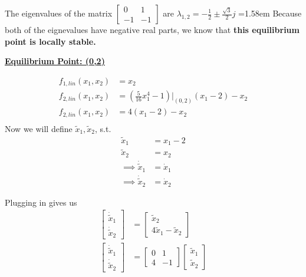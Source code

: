 \documentclass{article}
\begin{document}
  The eigenvalues of the matrix $\begin{bmatrix}
      0 & 1 \\
      -1&  -1
  \end{bmatrix}$ are $\lambda_{1,2} = -\frac{1}{2} \pm \frac{\sqrt{3}}{2}j$
  \newline
  \hangindent=1.58em
   Because both of the eignevalues have negative real parts, we know that \textbf{this
  equilibrium point is locally stable.} \newline
  
  \textbf{\underline{Equilibrium Point: (0,\hspace{0.8mm}2)}}

  \begin{align*}
    f_{1, lin}(x_1,x_2) &= x_2 \\
    f_{2, lin}(x_1,x_2) &= (\frac{5}{16}x_1^4 -1)\bigg|_{(0,2)}(x_1-2) - x_2 \\
    f_{2, lin}(x_1,x_2) &= 4(x_1-2) -x_2 \\
  \end{align*}
  \indent Now we will define $\tilde{x}_1, \tilde{x}_2$, s.t.
  \begin{align*}
    \tilde{x}_1 &= x_1-2 \\
    \tilde{x}_2 &= x_2 \\
    \implies \dot{\tilde{x}}_1 &= \dot{x}_1 \\
    \implies \dot{\tilde{x}}_2 &= \dot{x}_2
  \end{align*}
  
  \indent Plugging in gives us
  \begin{align*}
    \begin{bmatrix}
      \dot{\tilde{x}}_1 \\
      \dot{\tilde{x}}_2
    \end{bmatrix} &=
    \begin{bmatrix}
      \tilde{x}_2 \\
      4\tilde{x}_1 - \tilde{x}_2
    \end{bmatrix} \\
    \begin{bmatrix}
      \dot{\tilde{x}}_1 \\
      \dot{\tilde{x}}_2
    \end{bmatrix} &=
    \begin{bmatrix}
      0 & 1 \\
      4 & -1
    \end{bmatrix} 
    \begin{bmatrix}
      \tilde{x}_1 \\
      \tilde{x}_2
    \end{bmatrix} 
  \end{align*}
\end{document}
